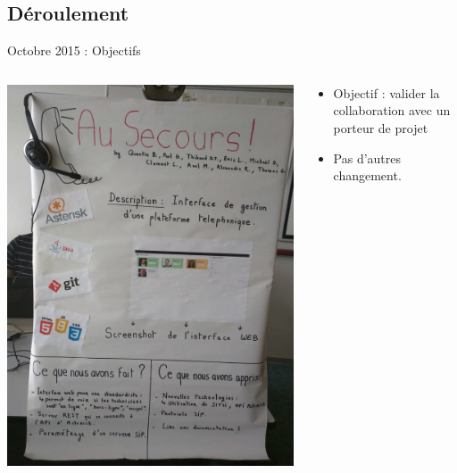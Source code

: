 \documentclass{beamer}
\begin{document}
\subsection{Déroulement}
\begin{frame}{Octobre 2015 : Objectifs}
  \begin{columns}
    \begin{column}{0.5\textwidth}
      \begin{center}
        \includegraphics[width=\textwidth]{includes/201510_salon.jpg}      
      \end{center}
    \end{column}
    \begin{column}{0.5\textwidth}
      \begin{itemize}
        \item Objectif : valider la collaboration avec un porteur de projet
        \item Pas d'autres changement.
      \end{itemize}
    \end{column}
  \end{columns}
\end{frame}
\end{document}
